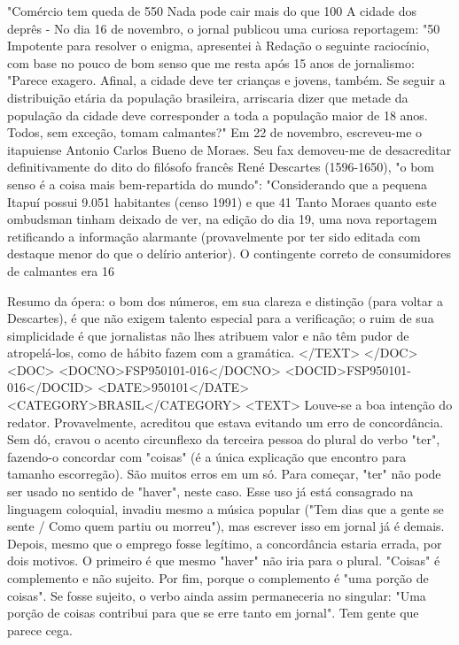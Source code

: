 "Comércio tem queda de 550%
Nada pode cair mais do que 100%
A cidade dos deprês - No dia 16 de novembro, o jornal publicou uma curiosa reportagem: "50%
Impotente para resolver o enigma, apresentei à Redação o seguinte raciocínio, com base no pouco de bom senso que me resta após 15 anos de jornalismo:
"Parece exagero. Afinal, a cidade deve ter crianças e jovens, também. Se seguir a distribuição etária da população brasileira, arriscaria dizer que metade da população da cidade deve corresponder a toda a população maior de 18 anos. Todos, sem exceção, tomam calmantes?"
Em 22 de novembro, escreveu-me o itapuiense Antonio Carlos Bueno de Moraes. Seu fax demoveu-me de desacreditar definitivamente do dito do filósofo francês René Descartes (1596-1650), "o bom senso é a coisa mais bem-repartida do mundo":
"Considerando que a pequena Itapuí possui 9.051 habitantes (censo 1991) e que 41%
Tanto Moraes quanto este ombudsman tinham deixado de ver, na edição do dia 19, uma nova reportagem retificando a informação alarmante (provavelmente por ter sido editada com destaque menor do que o delírio anterior). O contingente correto de consumidores de calmantes era 16%
 
Resumo da ópera: o bom dos números, em sua clareza e distinção (para voltar a Descartes), é que não exigem talento especial para a verificação; o ruim de sua simplicidade é que jornalistas não lhes atribuem valor e não têm pudor de atropelá-los, como de hábito fazem com a gramática.
</TEXT>
</DOC>
<DOC>
<DOCNO>FSP950101-016</DOCNO>
<DOCID>FSP950101-016</DOCID>
<DATE>950101</DATE>
<CATEGORY>BRASIL</CATEGORY>
<TEXT>
Louve-se a boa intenção do redator. Provavelmente, acreditou que estava evitando um erro de concordância. Sem dó, cravou o acento circunflexo da terceira pessoa do plural do verbo "ter", fazendo-o concordar com "coisas" (é a única explicação que encontro para tamanho escorregão).
São muitos erros em um só. Para começar, "ter" não pode ser usado no sentido de "haver", neste caso. Esse uso já está consagrado na linguagem coloquial, invadiu mesmo a música popular ("Tem dias que a gente se sente / Como quem partiu ou morreu"), mas escrever isso em jornal já é demais.
Depois, mesmo que o emprego fosse legítimo, a concordância estaria errada, por dois motivos.
O primeiro é que mesmo "haver" não iria para o plural. "Coisas" é complemento e não sujeito.
Por fim, porque o complemento é "uma porção de coisas". Se fosse sujeito, o verbo ainda assim permaneceria no singular: "Uma porção de coisas contribui para que se erre tanto em jornal".
Tem gente que parece cega.

